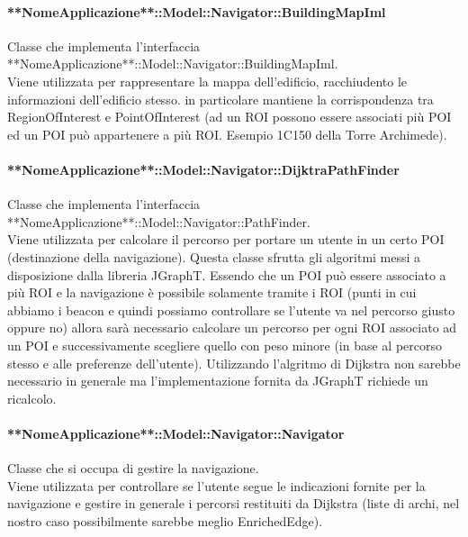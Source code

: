 \documentclass[../SpecificaTecnica.tex]{subfiles}
\begin{document}
				\paragraph{**NomeApplicazione**::Model::Navigator::BuildingMapIml}
					Classe che implementa l'interfaccia **NomeApplicazione**::Model::Navigator::BuildingMapIml. \\
					Viene utilizzata per rappresentare la mappa dell'edificio, racchiudento le informazioni dell'edificio stesso. in particolare mantiene la corrispondenza tra RegionOfInterest e PointOfInterest (ad un ROI possono essere associati più POI ed un POI può appartenere a più ROI. Esempio 1C150 della Torre Archimede). 
				\paragraph{**NomeApplicazione**::Model::Navigator::DijktraPathFinder}
					Classe che implementa l'interfaccia **NomeApplicazione**::Model::Navigator::PathFinder. \\
					Viene utilizzata per calcolare il percorso per portare un utente in un certo POI (destinazione della navigazione). Questa classe sfrutta gli algoritmi messi a disposizione dalla libreria JGraphT. Essendo che un POI può essere associato a più ROI e la navigazione è possibile solamente tramite i ROI (punti in cui abbiamo i beacon e quindi possiamo controllare se l'utente va nel percorso giusto oppure no) allora sarà necessario calcolare un percorso per ogni ROI associato ad un POI e successivamente scegliere quello con peso minore (in base al percorso stesso e alle preferenze dell'utente). Utilizzando l'algritmo di Dijkstra non sarebbe necessario in generale ma l'implementazione fornita da JGraphT richiede un ricalcolo.
				\paragraph{**NomeApplicazione**::Model::Navigator::Navigator}
					Classe che si occupa di gestire la navigazione. \\
					Viene utilizzata per controllare se l'utente segue le indicazioni fornite per la navigazione e gestire in generale i percorsi restituiti da Dijkstra (liste di archi, nel nostro caso possibilmente sarebbe meglio EnrichedEdge).
\end{document}
